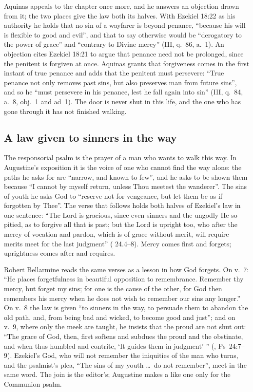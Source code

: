 Aquinas appeals to the chapter once more, and he answers an objection drawn
from it; the two places give the law both its halves. With Ezekiel 18:22 as
his authority he holds that no sin of a wayfarer is beyond penance, ``because
his will is flexible to good and evil'', and that to say otherwise would be
``derogatory to the power of grace'' and ``contrary to Divine mercy'' (III,
q.~86, a.~1). An objection cites Ezekiel 18:21 to argue that penance need not
be prolonged, since the penitent is forgiven at once. Aquinas grants that
forgiveness comes in the first instant of true penance and adds that the
penitent must persevere: ``True penance not only removes past sins, but also
preserves man from future sins'', and so he ``must persevere in his penance,
lest he fall again into sin'' (III, q.~84, a.~8, obj.~1 and ad~1). The door is
never shut in this life, and the one who has gone through it has not finished
walking.

\subsection{A law given to sinners in the way}

The responsorial psalm is the prayer of a man who wants to walk this way. In
Augustine's exposition it is the voice of one who cannot find the way alone:
the paths he asks for are ``narrow, and known to few'', and he asks to be shown
them because ``I cannot by myself return, unless Thou meetest the wanderer''.
The sins of youth he asks God to ``reserve not for vengeance, but let them be
as if forgotten by Thee''. The verse that follows holds both halves of Ezekiel's
law in one sentence: ``The Lord is gracious, since even sinners and the ungodly
He so pitied, as to forgive all that is past; but the Lord is upright too, who
after the mercy of vocation and pardon, which is of grace without merit, will
require merits meet for the last judgment'' (
24.4--8). Mercy comes first and forgets; uprightness comes after and
requires.

Robert Bellarmine reads the same verses as a lesson in how God forgets. On
v.~7: ``He places forgetfulness in beautiful opposition to remembrance.
Remember thy mercy, but forget my sins; for one is the cause of the other, for
God then remembers his mercy when he does not wish to remember our sins any
longer.'' On v.~8 the law is given ``to sinners in the way, to persuade them to
abandon the old path, and, from being bad and wicked, to become good and
just''; and on v.~9, where only the meek are taught, he insists that the proud
are not shut out: ``The grace of God, then, first softens and subdues the
proud and the obstinate, and when thus humbled and contrite, `It guides them in
judgment' '' (, Ps~24:7--9). Ezekiel's
God, who will not remember the iniquities of the man who turns, and the
psalmist's plea, ``The sins of my youth \ldots\ do not remember'', meet in the
same word. The join is the editor's; Augustine makes a like one only for the
Communion psalm.

